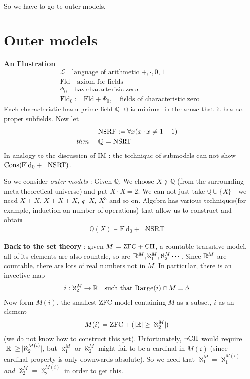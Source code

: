 \documentclass[12pt,a4paper]{article}
\begin{document}
So we have to go to outer models.

\section{Outer models}

\textbf{An Illustration}
\begin{align*}
& \mathscr{L} \quad \text{language of arithmetic } +, \cdot, 0,1 \\
& \text{Fld} \quad \text{axiom for fields} \\
& \Phi_0 \quad \text{has characterisic zero} \\
& \text{Fld}_0:= \text{Fld} + \Phi_0, \quad \text{fields of characteristic zero}
\end{align*}
Each characteristic has a prime field $\mathbb{Q}$. $\mathbb{Q}$ is minimal in the sense that it has no proper subfields. Now let
\begin{align*}
& \text{NSRF} := \forall x(x\cdot x \neq 1+1) \\
\emph{then } \quad & \mathbb{Q} \models \text{NSRT}
\end{align*}
In analogy to the discussion of IM : the technique of submodels can not show $\text{Cons} (\text{Fld}_0 + \neg \text{NSRT})$.

\quad So we consider \emph{outer models} : Given $\mathbb{Q}$, We choose $X\not\in \mathbb{Q}$ (from the surrounding meta-theoretical universe) and put $X\cdot X =2$. We can not just take $\mathbb{Q} \cup \{X\}$ - we need $X+X$, $X+X+X$, $q\cdot X$, $X^3$ and so on. Algebra has various techniques(for example, induction on number of operations) that allow us to construct and obtain
\begin{align*}
\mathbb{Q}(X) \models \text{Fld}_0 + \neg \text{NSRT}
\end{align*}
\s

\textbf{Back to the set theory} : given $M\models \text{ZFC} + \text{CH}$, a countable transitive model, all of its elements are also countale, so are $\mathbb{R}^M, \aleph_1^M, \aleph_2^M \cdots$. Since $\mathbb{R}^M$ are countable, there are lots of real numbers not in $M$. In particular, there is an invective map
\begin{align*}
i : \aleph_2^M \rightarrow \mathbb{R} \quad \text{such that } \text{Range}(i) \cap M = \phi
\end{align*}
Now form $M(i)$, the smallest ZFC-model containing $M$ as a subset, $i$ as an element
\begin{align*}
M(i) \models \text{ZFC} + (|\mathbb{R}| \geq |\aleph_2^M|)
\end{align*}
(we do not know how to construct this yet). Unfortunately, $\neg \text{CH}$ would require $|\mathbb{R}| \geq |\aleph_2^{M(i)}|$, but $\aleph_1^M$ or $\aleph_2^M$ might fail to be a cardinal in $M(i)$ (since cardinal property is only downwards absolute). So we need that $\aleph_1^M = \aleph_1^{M(i)}$ \emph{and} $\aleph_2^M = \aleph_2^{M(i)}$ in order to get this.
\end{document}
